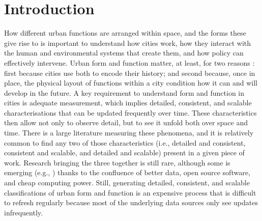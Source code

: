 \section{Introduction}
\label{sec:intro} %

How different urban functions are arranged within space, and the forms these
give rise to is important to understand how cities work, how they
interact with the human and environmental systems that create them, and how
policy can effectively intervene.
Urban form and function matter, at least, for two reasons \citep{dab_mf_2021a}:
first because cities use both to encode their history; and second because,
once in place, the physical layout of functions within a city condition how it
can and will develop in the future.
A key requirement to understand form and function in cities is adequate
measurement, which implies detailed, consistent, and scalable
characterisations that can be updated frequently over time. These
characteristics then allow not only to observe detail, but to see it unfold
both over space and time. 
There is a large literature measuring these phenomena, and it is relatively
common to find any two of those characteristics (i.e., detailed and consistent,
consistent and scalable, and detailed and scalable) present in a given piece
of work.
Research bringing the three together is still rare, although some is
emerging (e.g., \citealp{fleischmann2022geographical}) thanks to the confluence of better data, open
source software, and cheap computing power.
Still, generating detailed, consistent, and scalable classifications of urban
form and function is an expensive process that is difficult to refresh
regularly because most of the underlying data sources only see updates
infrequently.

